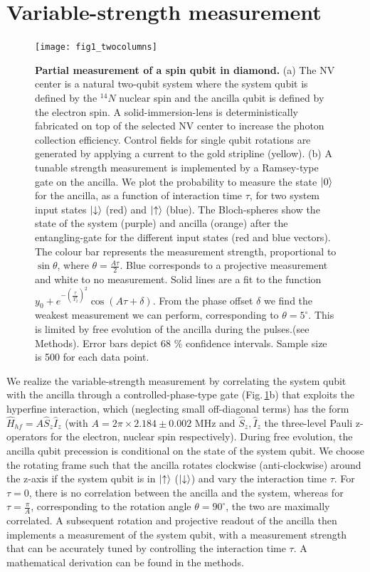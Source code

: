 \section{Variable-strength measurement}
\begin{figure}
	\centering
	\texttt{[image: fig1\_twocolumns]}
	\caption{\label{fig:amc-fig1} \textbf{Partial measurement of a spin qubit in diamond.} (a) The NV center is a natural two-qubit system where the system qubit is defined by the $^{14}N$ nuclear spin and the ancilla qubit is defined by the electron spin. A solid-immersion-lens is deterministically fabricated on top of the selected NV center to increase the photon collection efficiency. Control fields for single qubit rotations are generated by applying a current to the gold stripline (yellow).  (b) A tunable strength measurement is implemented by a Ramsey-type gate on the ancilla. We plot the probability to measure the state $\left|0\right>$  for the ancilla, as a function of interaction time $\tau$, for two system input states $\left|\downarrow\right>$ (red) and $\left|\uparrow\right>$ (blue). The Bloch-spheres show the state of the system (purple) and ancilla (orange) after the entangling-gate for the different input states (red and blue vectors). The colour bar represents the measurement strength, proportional to $\sin{\theta}$, where $\theta=\frac{A \tau}{2}$. Blue corresponds to a projective measurement and white to no measurement. Solid lines are a  fit to the function $y_0 + e^{-( \frac{\tau}{T_2^*})^2} \cos{(A \tau + \delta)} $. From the phase offset $\delta$ we find the weakest measurement we can perform, corresponding to $\theta = 5^{\circ}$. This is limited by free evolution of the ancilla during the pulses.(see Methods). Error bars depict 68 $\%$ confidence intervals. Sample size is 500 for each data point. }
\end{figure}

We realize the variable-strength measurement by correlating the system qubit with the ancilla through a controlled-phase-type gate (Fig.\,\ref{fig:amc-fig1}b) that exploits the hyperfine interaction, which (neglecting small off-diagonal terms) has the form $\hat{H}_{hf}=A\hat{S}_{z}\hat{I}_{z}$ (with $A = 2 \pi \times 2.184 \pm 0.002$ MHz and $\hat{S}_{z}, \hat{I}_{z}$ the three-level Pauli z-operators for the electron, nuclear spin respectively).  During free evolution, the ancilla qubit precession is conditional on the state of the system qubit. We choose the rotating frame such that the ancilla rotates clockwise (anti-clockwise) around the z-axis if the system qubit is in $\left|\uparrow\right>$ ($\left|\downarrow\right>$) and vary the interaction time $\tau$. For $\tau = 0$, there is no correlation between the ancilla and the system, whereas for $\tau = \frac{\pi}{A}$, corresponding to the rotation angle $\theta = 90^{\circ}$, the two are maximally correlated. A subsequent rotation and projective readout of the ancilla then implements a measurement of the system qubit, with a measurement strength that can be accurately tuned by controlling the interaction time $\tau$. A mathematical derivation  can be found in the methods.

